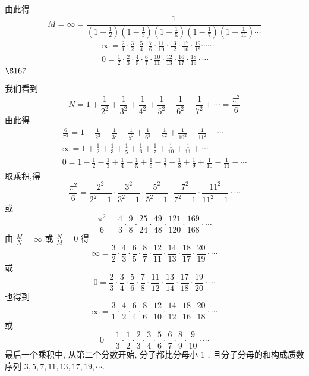由此得
\[
M=\infty=\frac{1}{\left(1-\frac{1}{2}\right)\left(1-\frac{1}{3}\right)\left(1-\frac{1}{5}\right)\left(1-\frac{1}{7}\right)\left(1-\frac{1}{11}\right) \cdots}
\]
\[
\begin{aligned}
& \infty=\frac{2}{1} \cdot \frac{3}{2} \cdot \frac{5}{4} \cdot \frac{7}{6} \cdot \frac{11}{10} \cdot \frac{13}{12} \cdot \frac{17}{16} \cdot \frac{19}{18} \cdots \cdots \\
& 0=\frac{1}{2} \cdot \frac{2}{3} \cdot \frac{4}{5} \cdot \frac{6}{7} \cdot \frac{10}{11} \cdot \frac{12}{13} \cdot \frac{16}{17} \cdot \frac{18}{19} \cdot \cdots
\end{aligned}
\]
$\S 167$ 

我们看到
\[
N=1+\frac{1}{2^{2}}+\frac{1}{3^{2}}+\frac{1}{4^{2}}+\frac{1}{5^{2}}+\frac{1}{6^{2}}+\frac{1}{7^{2}}+\cdots=\frac{\pi^{2}}{6}
\]
由此得
\[
\begin{gathered}
\frac{6}{\pi^{2}}=1-\frac{1}{2^{2}}-\frac{1}{3^{2}}-\frac{1}{5^{2}}+\frac{1}{6^{2}}-\frac{1}{7^{2}}+\frac{1}{10^{2}}-\frac{1}{11^{2}}-\cdots \\
\infty=1+\frac{1}{2}+\frac{1}{3}+\frac{1}{5}+\frac{1}{6}+\frac{1}{7}+\frac{1}{10}+\frac{1}{11}+\cdots \\
0=1-\frac{1}{2}-\frac{1}{3}+\frac{1}{4}-\frac{1}{5}+\frac{1}{6}-\frac{1}{7}-\frac{1}{8}+\frac{1}{9}+\frac{1}{10}-\frac{1}{11}-\cdots
\end{gathered}
\]
取乘积,得
\[
\frac{\pi^{2}}{6}=\frac{2^{2}}{2^{2}-1} \cdot \frac{3^{2}}{3^{2}-1} \cdot \frac{5^{2}}{5^{2}-1} \cdot \frac{7^{2}}{7^{2}-1} \cdot \frac{11^{2}}{11^{2}-1} \cdot \cdots
\]
或
\[
\frac{\pi^{2}}{6}=\frac{4}{3} \cdot \frac{9}{8} \cdot \frac{25}{24} \cdot \frac{49}{48} \cdot \frac{121}{120} \cdot \frac{169}{168} \cdot \cdots
\]
由 $\frac{M}{N}=\infty$ 或 $\frac{N}{M}=0$ 得
\[
\infty=\frac{3}{2} \cdot \frac{4}{3} \cdot \frac{6}{5} \cdot \frac{8}{7} \cdot \frac{12}{11} \cdot \frac{14}{13} \cdot \frac{18}{17} \cdot \frac{20}{19} \cdot \cdots
\]
或
\[
0=\frac{2}{3} \cdot \frac{3}{4} \cdot \frac{5}{6} \cdot \frac{7}{8} \cdot \frac{11}{12} \cdot \frac{13}{14} \cdot \frac{17}{18} \cdot \frac{19}{20} \cdot \cdots
\]
也得到
\[
\infty=\frac{3}{1} \cdot \frac{4}{2} \cdot \frac{6}{4} \cdot \frac{8}{6} \cdot \frac{12}{10} \cdot \frac{14}{12} \cdot \frac{18}{16} \cdot \frac{20}{18} \cdot \cdots
\]
或
\[
0=\frac{1}{3} \cdot \frac{1}{2} \cdot \frac{2}{3} \cdot \frac{3}{4} \cdot \frac{5}{6} \cdot \frac{6}{7} \cdot \frac{8}{9} \cdot \frac{9}{10} \cdot \cdots
\]
最后一个乘积中, 从第二个分数开始, 分子都比分母小 1 , 且分子分母的和构成质数序列 $3,5,7,11,13,17,19, \cdots$.


